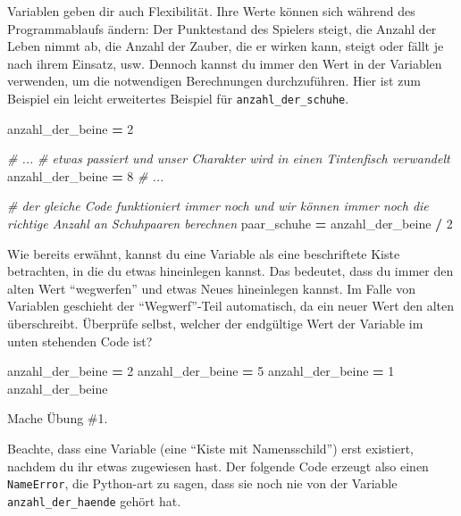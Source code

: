 \documentclass[
]{book}
\newenvironment{Shaded}{\begin{snugshade}}{\end{snugshade}}
\newcommand{\CommentTok}[1]{\textcolor[rgb]{0.56,0.35,0.01}{\textit{#1}}}
\newcommand{\DecValTok}[1]{\textcolor[rgb]{0.00,0.00,0.81}{#1}}
\newcommand{\NormalTok}[1]{#1}
\newcommand{\OperatorTok}[1]{\textcolor[rgb]{0.81,0.36,0.00}{\textbf{#1}}}
\begin{document}
Variablen geben dir auch Flexibilität. Ihre Werte können sich während des Programmablaufs ändern: Der Punktestand des Spielers steigt, die Anzahl der Leben nimmt ab, die Anzahl der Zauber, die er wirken kann, steigt oder fällt je nach ihrem Einsatz, usw. Dennoch kannst du immer den Wert in der Variablen verwenden, um die notwendigen Berechnungen durchzuführen. Hier ist zum Beispiel ein leicht erweitertes Beispiel für \texttt{anzahl\_der\_schuhe}.

\begin{Shaded}
\begin{Highlighting}[]
\NormalTok{anzahl\_der\_beine }\OperatorTok{=} \DecValTok{2}

\CommentTok{\# ...}
\CommentTok{\# etwas passiert und unser Charakter wird in einen Tintenfisch verwandelt}
\NormalTok{anzahl\_der\_beine }\OperatorTok{=} \DecValTok{8}
\CommentTok{\# ...}

\CommentTok{\# der gleiche Code funktioniert immer noch und wir können immer noch die richtige Anzahl an Schuhpaaren berechnen}
\NormalTok{paar\_schuhe }\OperatorTok{=}\NormalTok{ anzahl\_der\_beine }\OperatorTok{/} \DecValTok{2}
\end{Highlighting}
\end{Shaded}

Wie bereits erwähnt, kannst du eine Variable als eine beschriftete Kiste betrachten, in die du etwas hineinlegen kannst. Das bedeutet, dass du immer den alten Wert ``wegwerfen'' und etwas Neues hineinlegen kannst. Im Falle von Variablen geschieht der ``Wegwerf''-Teil automatisch, da ein neuer Wert den alten überschreibt. Überprüfe selbst, welcher der endgültige Wert der Variable im unten stehenden Code ist?

\begin{Shaded}
\begin{Highlighting}[]
\NormalTok{anzahl\_der\_beine }\OperatorTok{=} \DecValTok{2}
\NormalTok{anzahl\_der\_beine }\OperatorTok{=} \DecValTok{5}
\NormalTok{anzahl\_der\_beine }\OperatorTok{=} \DecValTok{1}
\NormalTok{anzahl\_der\_beine}
\end{Highlighting}
\end{Shaded}

Mache Übung \#1.

Beachte, dass eine Variable (eine ``Kiste mit Namensschild'') erst existiert, nachdem du ihr etwas zugewiesen hast. Der folgende Code erzeugt also einen \texttt{NameError}, die Python-art zu sagen, dass sie noch nie von der Variable \texttt{anzahl\_der\_haende} gehört hat.
\end{document}
